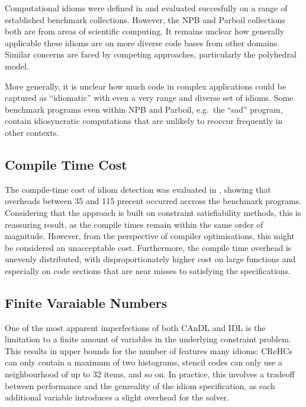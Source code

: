     Computational idioms were defined in
     and
    evaluated succesfully on a range of established benchmark collections.
    However, the NPB and Parboil collections both are from areas of scientific
    computing.
    It remains unclear how generally applicable these idioms are on more
    diverse code bases from other domains.
    Similar concerns are faced by competing approaches, particularly the
    polyhedral model.

    More generally, it is unclear how much code in complex applications could
    be captured as ``idiomatic'' with even a very range and diverse set of
    idioms.
    Some benchmark programs even within NPB and Parboil, e.g.\ the ``sad''
    program, contain idiosyncratic computations that are unlikely to reoccur
    frequently in other contexts.

\subsection*{Compile Time Cost}

    The compile-time cost of idiom detection was evaluated in
    , showing that overheads between 35 and 115 precent
    occurred accross the benchmark programs.
    Considering that the approach is built on constraint satisfiability
    methods, this is reassuring result, as the compile times remain within the
    same order of magnitude.
    However, from the perspective of compiler optimisations, this might be
    considered an unacceptable cost.
    Furthermore, the compile time overhead is unevenly distributed, with
    disproportionately higher cost on large functions and especially on code
    sections that are near misses to satisfying the specifications.

\subsection*{Finite Varaiable Numbers}

    One of the most apparent imperfections of both CAnDL and IDL is the
    limitation to a finite amount of variables in the underlying constraint
    problem.
    This results in upper bounds for the number of features many idioms:
    CReHCs can only contain a maximum of two histograms, stencil codes can only
    use a neighbourhood of up to 32 items, and so on.
    In practice, this involves a tradeoff between performance and the genreality
    of the idiom specification, as each additional variable introduces a slight
    overhead for the solver.

